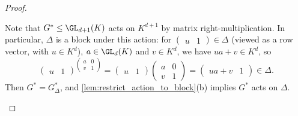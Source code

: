 \begin{proof}
\begin{enumerate}[(a)]
              Note that $G^* \leq \GL_{d+1}(K)$ acts on $K^{d+1}$ by matrix right-multiplication. In particular, $\Delta$ is a block under this action: for $\begin{pmatrix}
                      u & 1
                  \end{pmatrix} \in \Delta$ (viewed as a row vector, with $u \in K^d$), $a \in \GL_d(K)$ and $v \in K^d$, we have $ua + v \in K^d$, so
              $$\begin{pmatrix}
                      u & 1
                  \end{pmatrix}^{\left(
                  \begin{smallmatrix}
                          a & 0 \\
                          v & 1
                      \end{smallmatrix}\right)} =
                  \begin{pmatrix}
                      u & 1
                  \end{pmatrix}
                  \begin{pmatrix}
                      a & 0 \\
                      v & 1
                  \end{pmatrix} =
                  \begin{pmatrix}
                      ua + v & 1
                  \end{pmatrix} \in \Delta.$$
              Then $G^* = G^*_\Delta$, and \autoref{lem:restrict_action_to_block}(b) implies $G^*$ acts on $\Delta$.


\end{enumerate}
\end{proof}
